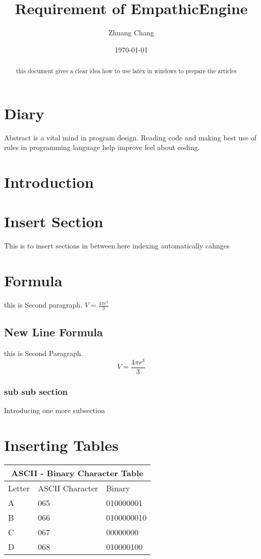 \documentclass{article}
\begin{document}
\title{Requirement of EmpathicEngine}
\author{Zhuang Chang}
\date{\today}

\maketitle

\begin{abstract}
this document gives a clear idea how to use latex in windows 
to prepare the articles
\end{abstract}

\tableofcontents

\section{Diary}
Abstract is a vital mind in program design.
Reading code and making best use of rules in programming language
help improve feel about coding.
\section{Introduction}

\section{Insert Section}
This is to insert sections in between.here indexing automatically cahnges

\section{Formula}
this is Second paragraph.
$ V = \frac{4 \pi r^3}{3} $
\subsection{New Line Formula}
this is Second Paragraph.
$$ V = \frac{4 \pi r^3}{3} $$
\subsubsection{sub sub section}
Introducing one more subsection
\section{Inserting Tables}
\begin{tabular}{|p{3cm}|p{3cm}|p{3cm}|}
\hline
\multicolumn{3}{|c|}{ASCII - Binary Character Table}\\
\hline
\hline
Letter & ASCII Character & Binary\\
\hline
A&065&010000001\\
B&066&0100000010\\
C& 067& 00000000\\
D& 068& 010000100\\
\hline

\end{tabular}
\end{document}
